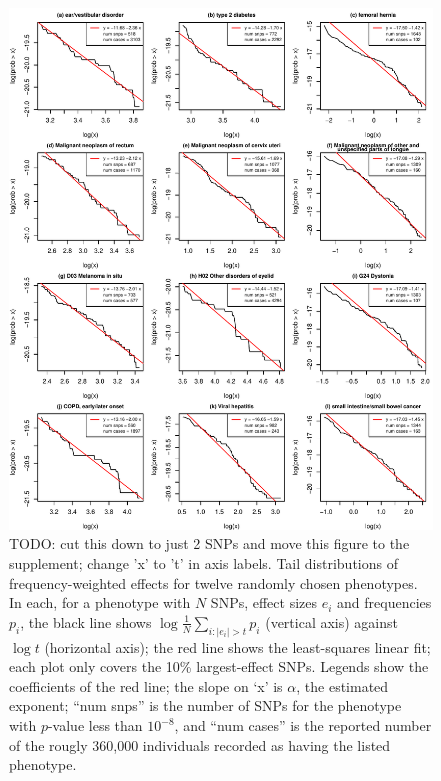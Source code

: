 \documentclass{article}
\theoremstyle{remark}
\theoremstyle{definition}
\begin{document}
\begin{figure}
    \begin{center}
    \includegraphics{snp_effects/examples}
    \end{center}
    \caption{
        TODO: cut this down to just 2 SNPs and move this figure to the supplement; change 'x' to 't' in axis labels.
        Tail distributions of frequency-weighted effects
        for twelve randomly chosen phenotypes.
        In each, for a phenotype with $N$ SNPs,
        effect sizes $e_i$ and frequencies $p_i$,
        the black line shows
        $\log \frac{1}{N} \sum_{i : |e_i| > t} p_i$ (vertical axis)
        against $\log t$ (horizontal axis);
        the red line shows the least-squares linear fit;
        each plot only covers the 10\% largest-effect SNPs.
        Legends show the coefficients of the red line; the slope on `x' is $\alpha$,
        the estimated exponent;
        ``num snps'' is the number of SNPs for the phenotype with $p$-value less than $10^{-8}$,
        and ``num cases'' is the reported number of the rougly 360,000 individuals
        recorded as having the listed phenotype.
        \label{fig:example_snps}
    }
\end{figure}
\end{document}

